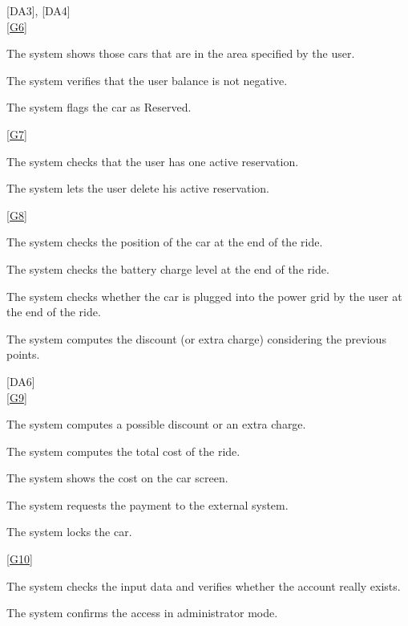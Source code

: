 \documentclass[11pt,a4paper]{report}
\begin{document}
	[DA3], [DA4]\\
\noindent\ref{G6} \\
\begin{Req}[resume]
\item The system shows those cars that are in the area specified by the user.
\item The system verifies that the user balance is not negative.
\item The system flags the car as Reserved.
\end{Req}
\noindent\ref{G7} \\
\begin{Req}[resume]
\item The system checks that the user has one active reservation.
\item The system lets the user delete his active reservation.
\end{Req}
\noindent\ref{G8} \\
\begin{Req}[resume]
\item The system checks the position of the car at the end of the ride.
\item The system checks the battery charge level at the end of the ride.
\item The system checks whether the car is plugged into the power grid by the user at the end of the ride.
\item The system computes the discount (or extra charge) considering the previous points.
\end{Req}
[DA6]\\
\noindent\ref{G9} \\
\begin{Req}[resume]
\item The system computes a possible discount or an extra charge.
\item The system computes the total cost of the ride.
\item The system shows the cost on the car screen.
\item The system requests the payment to the external system.
\item The system locks the car.
\end{Req}
\noindent\ref{G10} \\
\begin{Req}[resume]
\item The system checks the input data and verifies whether the account really exists.
\item The system confirms the access in administrator mode.
\end{Req}
\end{document}
